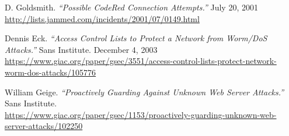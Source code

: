 \begin{thebibliography}{99}
 D. Goldsmith. 
\emph{``Possible CodeRed Connection Attempts.''}
July 20, 2001\\
\url{http://lists.jammed.com/incidents/2001/07/0149.html}

 Dennis Eck.
\emph{``Access Control Lists to Protect a Network from Worm/DoS Attacks.''}
Sans Institute. December 4, 2003\\
\url{https://www.giac.org/paper/gsec/3551/access-control-lists-protect-network-worm-dos-attacks/105776}

 William Geige.
\emph{``Proactively Guarding Against Unknown Web Server Attacks.''}
Sans Institute.\\
\url{https://www.giac.org/paper/gsec/1153/proactively-guarding-unknown-web-server-attacks/102250}
\end{thebibliography}
